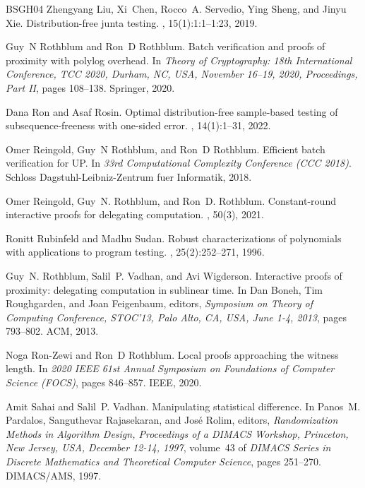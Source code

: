 \documentclass[10pt,a4paper]{article}
\begin{document}
\begin{thebibliography}{BSGH{\etalchar{+}}04}
Zhengyang Liu, Xi~Chen, Rocco~A. Servedio, Ying Sheng, and Jinyu Xie.
\newblock Distribution-free junta testing.
, 15(1):1:1--1:23, 2019.

Guy~N Rothblum and Ron~D Rothblum.
\newblock Batch verification and proofs of proximity with polylog overhead.
\newblock In {\em Theory of Cryptography: 18th International Conference, TCC
  2020, Durham, NC, USA, November 16--19, 2020, Proceedings, Part II}, pages
  108--138. Springer, 2020.

Dana Ron and Asaf Rosin.
\newblock Optimal distribution-free sample-based testing of
  subsequence-freeness with one-sided error.
, 14(1):1--31,
  2022.

Omer Reingold, Guy~N Rothblum, and Ron~D Rothblum.
\newblock Efficient batch verification for {UP}.
\newblock In {\em 33rd Computational Complexity Conference (CCC 2018)}. Schloss
  Dagstuhl-Leibniz-Zentrum fuer Informatik, 2018.

Omer Reingold, Guy~N. Rothblum, and Ron~D. Rothblum.
\newblock Constant-round interactive proofs for delegating computation.
, 50(3), 2021.

Ronitt Rubinfeld and Madhu Sudan.
\newblock Robust characterizations of polynomials with applications to program
  testing.
, 25(2):252--271, 1996.

Guy~N. Rothblum, Salil~P. Vadhan, and Avi Wigderson.
\newblock Interactive proofs of proximity: delegating computation in sublinear
  time.
\newblock In Dan Boneh, Tim Roughgarden, and Joan Feigenbaum, editors, {\em
  Symposium on Theory of Computing Conference, STOC'13, Palo Alto, CA, USA,
  June 1-4, 2013}, pages 793--802. {ACM}, 2013.

Noga Ron-Zewi and Ron~D Rothblum.
\newblock Local proofs approaching the witness length.
\newblock In {\em 2020 IEEE 61st Annual Symposium on Foundations of Computer
  Science (FOCS)}, pages 846--857. IEEE, 2020.

Amit Sahai and Salil~P. Vadhan.
\newblock Manipulating statistical difference.
\newblock In Panos~M. Pardalos, Sanguthevar Rajasekaran, and Jos{\'{e}} Rolim,
  editors, {\em Randomization Methods in Algorithm Design, Proceedings of a
  {DIMACS} Workshop, Princeton, New Jersey, USA, December 12-14, 1997},
  volume~43 of {\em {DIMACS} Series in Discrete Mathematics and Theoretical
  Computer Science}, pages 251--270. {DIMACS/AMS}, 1997.


\end{thebibliography}
\end{document}

